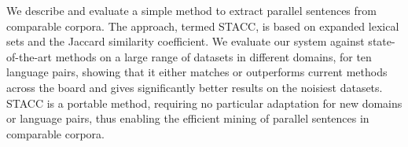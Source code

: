 We describe and evaluate a simple method to extract parallel sentences from comparable corpora. The approach, termed STACC, is based on expanded lexical sets and the Jaccard similarity coefficient. We evaluate our system against state-of-the-art methods on a large range of datasets in different domains, for ten language pairs, showing that it either matches or outperforms current methods across the board and gives significantly better results on the noisiest datasets. STACC is a portable method, requiring no particular adaptation for new domains or language pairs, thus enabling the efficient mining of parallel sentences in comparable corpora.
